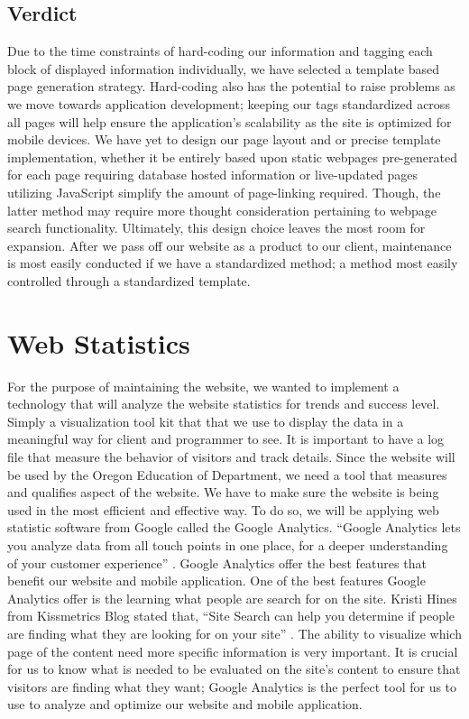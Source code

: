 \documentclass[letterpaper,10pt, draftclsnofoot,onecolumn]{IEEEtran}
\begin{document}
{{{{{{{{{{{{{{{{\subsection[Verdict]{\color{black}
Verdict}
{\color{black}\normalsize\noindent
{Due to the time constraints of hard-coding our information and tagging each block of displayed information individually, we have selected a template based page generation strategy. 
Hard-coding also has the potential to raise problems as we move towards application development; keeping our tags standardized across all pages will help ensure the application’s scalability as the site is optimized for mobile devices. 
We have yet to design our page layout and or precise template implementation, whether it be entirely based upon static webpages pre-generated for each page requiring database hosted information or live-updated pages utilizing JavaScript simplify the amount of page-linking required. 
Though, the latter method may require more thought consideration pertaining to webpage search functionality. 
Ultimately, this design choice leaves the most room for expansion. 
After we pass off our website as a product to our client, maintenance is most easily conducted if we have a standardized method; a method most easily controlled through a standardized template.}

\section[Web Statistics ]{\color{black}
Web Statistics}
{\color{black}\normalsize\noindent
{For the purpose of maintaining the website, we wanted to implement a technology that will analyze the website statistics for trends and success level. 
Simply a visualization tool kit that that we use to display the data in a meaningful way for client and programmer to see. 
It is important to have a log file that measure the behavior of visitors and track details.
Since the website will be used by the Oregon Education of Department, we need a tool that measures and qualifies aspect of the website.
We have to make sure the website is being used in the most efficient and effective way. 
To do so, we will be applying web statistic software from Google called the Google Analytics. 
“Google Analytics lets you analyze data from all touch points in one place, for a deeper understanding of your customer experience” \cite{IEEEexample:article9}.
Google Analytics offer the best features that benefit our website and mobile application.
One of the best features Google Analytics offer is the learning what people are search for on the site. 
Kristi Hines from Kissmetrics Blog stated that, “Site Search can help you determine if people are finding what they are looking for on your site” \cite{IEEEexample:article10}.
The ability to visualize which page of the content need more specific information is very important. 
It is crucial for us to know what is needed to be evaluated on the site’s content to ensure that visitors are finding what they want; Google Analytics is the perfect tool for us to use to analyze and optimize our website and mobile application. 
}

}}}}}}}}}}}}}}}}}}
\end{document}
